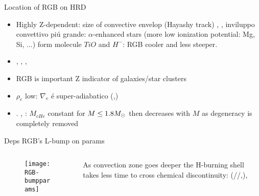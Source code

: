 \begin{frame}{Location of RGB on HRD}
\begin{itemize}
\item Highly Z-dependent: size of convective envelop (Hayashy track) , \xaumenta{\kappa}, inviluppo convettivo pi\'u grande:  $\alpha$-enhanced stars (more low ionization potential: Mg, Si, ...) form molecule $TiO$ and $H^-$: RGB cooler and less steeper.
\item {}, \xdiminuisce{\kappa}, , 
\item RGB is important Z indicator of galaxies/star clusters
\item $\rho_e$ low: $\nabla_e$ \'e super-adiabatico (,)
\item {}. , : $M_{cHe}$ constant for $M\leq1.8M_{\odot}{}$ then decreases with $M$ as degeneracy is completely removed 
\end{itemize}
\end{frame}

\begin{frame}{Deps RGB's L-bump on params}
\begin{columns}[T]\begin{column}{0.52\textwidth}
\begin{figure}[!ht]
\texttt{[image: RGB-bumpparams]}\label{fig:RGB-bumpparams}
\end{figure}
\end{column}
\begin{column}{0.43\textwidth}
As convection zone goes deeper the H-burning shell takes less time to cross chemical discontinuity: (//,), 
\end{column}\end{columns}
\end{frame}

